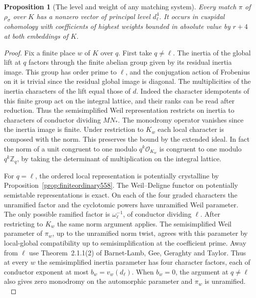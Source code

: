 \documentclass[a4paper,11pt]{article}
\newtheorem{proposition}{Proposition}[section]
\theoremstyle{definition}
\theoremstyle{remark}
\newcommand{\ZZ}{\mathbb Z}\newcommand{\ord}{\operatorname{ord}}
\numberwithin{equation}{section}
\begin{document}
\begin{proposition}[The level and weight of any matching system]
\leavevmode\label{prop:levelofmatch561}
Every match \(\pi\) of \(\rho_\sigma\) over \(K\) has a nonzero
vector of principal level \(d_\ell^4\). It occurs in cuspidal
cohomology with coefficients of highest weights bounded in
absolute value by \(r+4\) at both embeddings of \(K\).
\end{proposition}
\begin{proof}
Fix a finite place \(w\) of \(K\) over \(q\). First take
\(q\ne\ell\). The inertia of the global lift at \(q\) factors
through the finite abelian group given by its residual inertia
image. This group has order prime to \(\ell\), and the conjugation
action of Frobenius on it is trivial since the residual global
image is diagonal. The multiplicities of the inertia characters
of the lift equal those of \(d\). Indeed the character idempotents
of this finite group act on the integral lattice, and their
ranks can be read after reduction. Thus the semisimplified Weil
representation restricts on inertia to characters of conductor
dividing \(M N_*\). The monodromy operator vanishes since the
inertia image is finite. Under restriction to \(K_w\) each local
character is composed with the norm. This preserves the bound
by the extended ideal. In fact the norm of a unit congruent to
one modulo \(q^k\mathcal O_{K_w}\) is congruent to one modulo
\(q^k\ZZ_q\), by taking the determinant of multiplication on
the integral lattice.

For \(q=\ell\), the ordered local representation is potentially
crystalline by Proposition~\ref{prop:finiteordinary558}. The
Weil--Deligne functor on potentially semistable representations
is exact. On each of the four graded characters the unramified
factor and the cyclotomic powers have unramified Weil parameter.
The only possible ramified factor is
\(\omega_\ell^{-1}\), of conductor dividing \(\ell\).
After restricting to \(K_w\) the same norm argument applies.
The semisimplified Weil parameter of \(\pi_w\), up to the
unramified norm twist, agrees with this parameter by local-global
compatibility up to semisimplification at the coefficient prime.
Away from \(\ell\) use Theorem~2.1.1(2) of Barnet-Lamb, Gee,
Geraghty and Taylor. Thus at every \(w\) the semisimplified
inertia parameter has four character factors, each of conductor
exponent at most \(b_w=v_w(d_\ell)\). When \(b_w=0\), the
argument at \(q\ne\ell\) also gives zero monodromy on the
automorphic parameter and \(\pi_w\) is unramified.
~\cite{XII-IX-lgp361,XII-IX-blggt560}


\end{proof}
\end{document}
